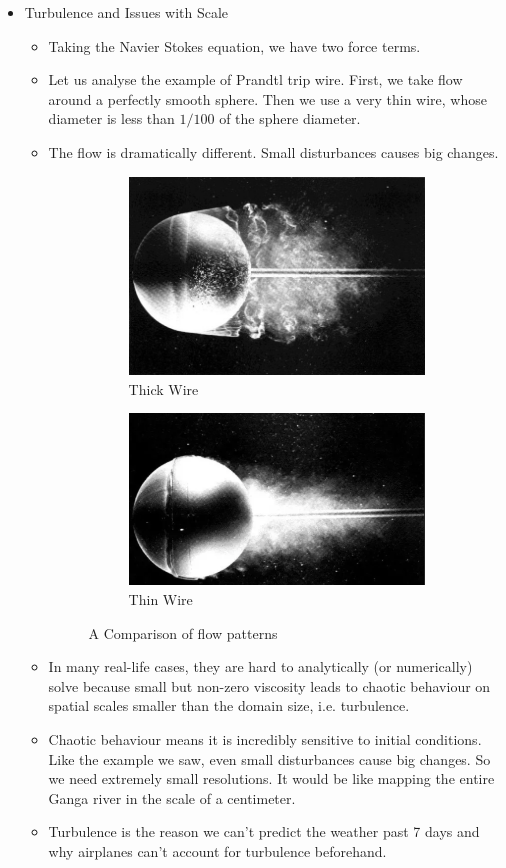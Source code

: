 \documentclass[12pt]{article}
\begin{document}
\begin{itemize}
\item Turbulence and Issues with Scale
\begin{itemize}
    \item Taking the Navier Stokes equation, we have two force terms. 
    \item Let us analyse the example of Prandtl trip wire. First, we take flow around a perfectly smooth sphere. Then we use a very thin wire, whose diameter is less than $1/100$ of the sphere diameter.
    \item The flow is dramatically different. Small disturbances causes big changes.
\begin{figure}[hbt!]
\centering
\begin{subfigure}{0.4\textwidth}
  \centering
  \includegraphics[width=.5\linewidth]{plot2.jpeg}
  \caption{Thick Wire}
  \label{fig:sub1}
\end{subfigure}%
\begin{subfigure}{0.4\textwidth}
  \centering
  \includegraphics[width=.5\linewidth]{plot33.png}
  \caption{Thin Wire}
  \label{fig:sub2}
\end{subfigure}
\caption{A Comparison of flow patterns}
\label{fig:test}
\end{figure}
\FloatBarrier 
    \item In many real-life cases, they are hard to analytically (or numerically) solve because small but non-zero viscosity leads to chaotic behaviour on spatial scales smaller than the domain size, i.e. turbulence.
    \item Chaotic behaviour means it is incredibly sensitive to initial conditions. Like the example we saw, even small disturbances cause big changes. So we need extremely small resolutions. It would be like mapping the entire Ganga river in the scale of a centimeter.
    \item Turbulence is the reason we can't predict the weather past 7 days and why airplanes can't account for turbulence beforehand. 

\end{itemize}
\end{itemize}
\end{document}
